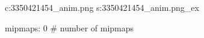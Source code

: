 c:3350421454\textures\hexer_anim.png
s:3350421454\textures\hexer_anim.png_ex

mipmaps: 0  # number of mipmaps

